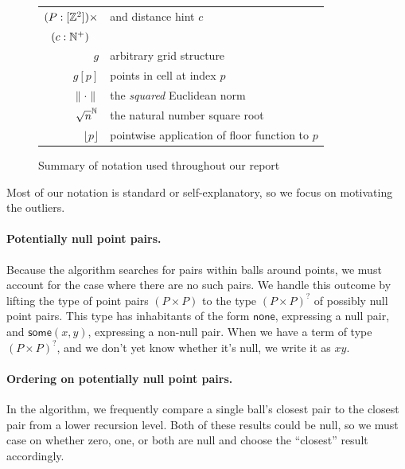 \documentclass{article}
\begin{document}
\begin{figure}[H]
\begin{center}
\begin{tabular} {|| r | l ||}
  $(P : [\mathbb{Z}^2]) \times$ & and distance hint $c$ \\
  $(c : \N^+){\color{white}\times}$ & \\
  \hline
  $g$ & arbitrary grid structure \\
  \hline
  $g[p]$ & points in cell at index $p$ \\
  \hline
  $\| \cdot \|$ & the \textit{squared} Euclidean norm \\
  \hline
  $\sqrt{n}^{\mathbb{N}}$ & the natural number square root \\
  \hline
  $\lfloor p \rfloor$ & pointwise application of floor function to $p$ \\
  \hline
\end{tabular}
\end{center}
\caption{Summary of notation used throughout our report}
\end{figure}

Most of our notation is standard or self-explanatory, so we focus on motivating the outliers.

\paragraph{Potentially null point pairs.}
Because the algorithm searches for pairs within balls around points, we must account for the case where there are no such pairs.
We handle this outcome by lifting the type of point pairs $(P \times P)$ to the type $(P \times P)^?$ of possibly null point pairs.
This type has inhabitants of the form $\mathsf{none}$, expressing a null pair, and $\mathsf{some}(x, y)$, expressing a non-null pair.
When we have a term of type $(P \times P)^?$, and we don't yet know whether it's null, we write it as $x\!y$.


\paragraph{Ordering on potentially null point pairs.}
In the algorithm, we frequently compare a single ball's closest pair to the closest pair from a lower recursion level.
Both of these results could be null, so we must case on whether zero, one, or both are null and choose the ``closest'' result accordingly.
\end{document}
